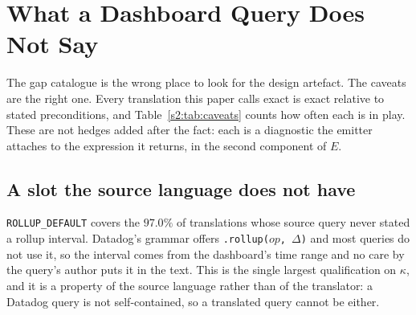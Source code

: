 
\section{What a Dashboard Query Does Not Say}
\label{s2:sec:unsaid}

The gap catalogue is the wrong place to look for the design artefact. The caveats are the
right one. Every translation this paper calls exact is exact relative to stated
preconditions, and Table~\ref{s2:tab:caveats} counts how often each is in play. These are
not hedges added after the fact: each is a diagnostic the emitter attaches to the expression
it returns, in the second component of $E$.

\begin{table}[htbp]\centering\footnotesize

\caption{Preconditions carried by the $8{,}475$ translated expressions. A translation may
carry more than one. Shares are of the translated set rather than of the corpus.}
\label{s2:tab:caveats}
\end{table}

\subsection{A slot the source language does not have}
\label{s2:sec:rollup}

\texttt{ROLLUP\_DEFAULT} covers the $97.0\%$ of translations whose source query never
stated a rollup interval. Datadog's grammar offers \texttt{.rollup($\mathit{op}$,
$\Delta$)} and most queries do not use it, so the interval comes from the dashboard's time
range and no care by the query's author puts it in the text. This is the single largest
qualification on $\kappa$, and it is a property of the source language rather than of the
translator: a Datadog query is not self-contained, so a translated query cannot be either.

